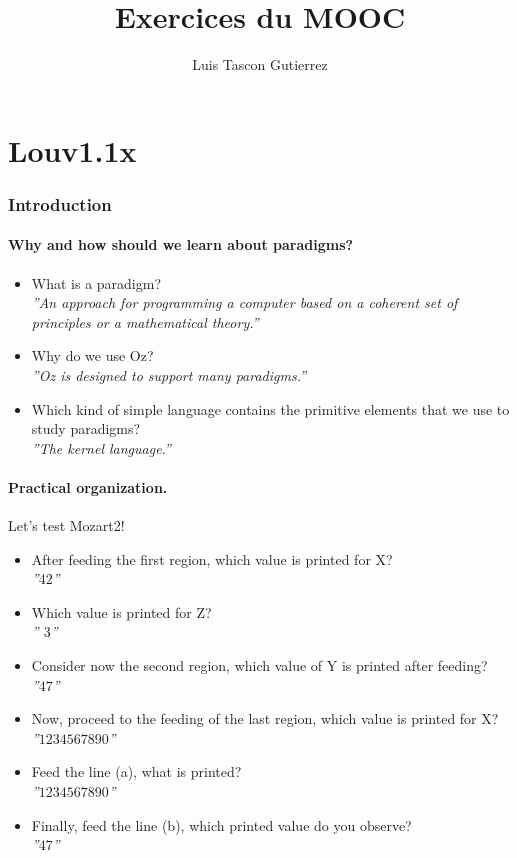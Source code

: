 \documentclass[fr,license=none]{../../../eplsummary}
\author{Luis Tascon Gutierrez}
\title{Exercices du MOOC}
\begin{document}
	
	\maketitle
	\tableofcontents
\part{Louv1.1x}	
	\section{Introduction}
	
		\subsection{Why and how should we learn about paradigms?}
			\begin{itemize}
				\item What is a paradigm? \\
					\textit{''An approach for programming a computer based on a coherent set of principles or a mathematical theory.''}
				\item Why do we use Oz?\\
					\textit{''Oz is designed to support many paradigms.''}
				\item Which kind of simple language contains the primitive elements that we use to study paradigms?\\
					\textit{''The kernel language.''}
			\end{itemize}
		\subsection{Practical organization.}
			Let's test Mozart2!
			
			\begin{itemize}
				\item After feeding the first region, which value is printed for X?\\
					\textit{''$42$''}
				\item Which value is printed for Z?\\
					\textit{'' \AC $3$''}
				\item Consider now the second region, which value of Y is printed after feeding?\\
					\textit{''$47$''}
				\item Now, proceed to the feeding of the last region, which value is printed for X?\\
					\textit{''$1234567890$''}
				\item Feed the line (a), what is printed?\\
					\textit{''$1234567890$''}
				\item Finally, feed the line (b), which printed value do you observe?\\
					\textit{''$47$''}
			\end{itemize}
			
\end{document}
